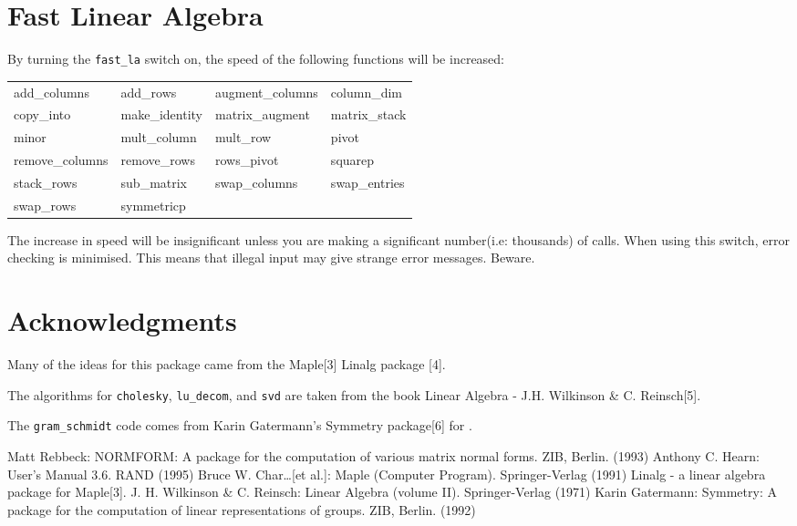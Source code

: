 \section{Fast Linear Algebra}

By turning the {\tt fast\_la} switch on, the speed of the following 
functions will be increased:

\begin{tabular}{l l l l}
   add\_columns    & add\_rows      & augment\_columns & column\_dim  \\
   copy\_into      & make\_identity & matrix\_augment  & matrix\_stack\\
   minor           & mult\_column   &  mult\_row       & pivot        \\
   remove\_columns & remove\_rows   & rows\_pivot      & squarep      \\
   stack\_rows     & sub\_matrix    & swap\_columns    & swap\_entries\\
   swap\_rows      & symmetricp                                     
\end{tabular}

The increase in speed will be insignificant unless you are making a 
significant number(i.e: thousands) of calls. When using this switch, 
error checking is minimised. This means that illegal input may give
strange error messages. Beware.

\newpage

\section{Acknowledgments}

Many of the ideas for this package came from the Maple[3] Linalg package
[4].

The algorithms for {\tt cholesky}, {\tt lu\_decom}, and {\tt svd} are 
taken from the book Linear Algebra - J.H. Wilkinson \& C. Reinsch[5].

The {\tt gram\_schmidt} code comes from Karin Gatermann's Symmetry 
package[6] for {\REDUCE}.


\begin{thebibliography}{}
 Matt Rebbeck: NORMFORM: A {\REDUCE} package for the 
computation of various matrix normal forms. ZIB, Berlin. (1993)
 Anthony C. Hearn: {\REDUCE} User's Manual 3.6.
	RAND (1995)
 Bruce W. Char\ldots [et al.]: Maple (Computer 
        Program). Springer-Verlag (1991)
 Linalg - a linear algebra package for Maple[3].
 J. H. Wilkinson \& C. Reinsch: Linear Algebra 
(volume II). Springer-Verlag (1971)
 Karin Gatermann: Symmetry: A {\REDUCE} package for the 
computation of linear representations of groups. ZIB, Berlin. (1992)
\end{thebibliography}





